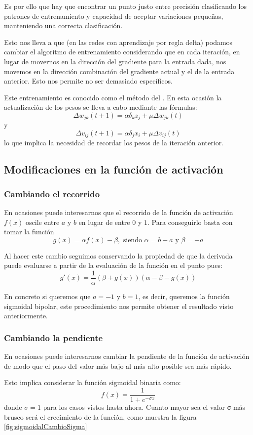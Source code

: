Es por ello que hay que encontrar un punto justo entre precisión clasificando los patrones de entrenamiento y capacidad de aceptar variaciones pequeñas, manteniendo una correcta clasificación.

Esto nos lleva a que (en las redes con aprendizaje por regla delta) podamos cambiar el algoritmo de entrenamiento considerando que en cada iteración, en lugar de movernos en la dirección del gradiente para la entrada dada, nos movemos en la dirección combinación del gradiente actual y el de la entrada anterior. Esto nos permite no ser demasiado específicos.

Este entrenamiento es conocido como el método del . En esta ocasión la actualización de los pesos se lleva a cabo mediante las fórmulas:
\[Δw_{jk}(t+1) = αδ_kz_j + μΔw_{jk}(t)\]
y
\[Δv_{ij}(t+1) = αδ_jx_i + μΔv_{ij}(t)\]
lo que implica la necesidad de recordar los pesos de la iteración anterior.

\subsection{Modificaciones en la función de activación}
\subsubsection{Cambiando el recorrido}
En ocasiones puede interesarnos que el recorrido de la función de activación $f(x)$ oscile entre $a$ y $b$ en lugar de entre $0$ y $1$. Para conseguirlo basta con tomar la función
\[g(x)=αf(x)-β, \text{ siendo } α=b-a \text{ y } β = -a\]

Al hacer este cambio seguimos conservando la propiedad de que la derivada puede evaluarse a partir de la evaluación de la función en el punto pues:
\[g'(x) = \frac{1}{α}(β+g(x))(α-β-g(x))\]

En concreto si queremos que $a=-1$ y $b=1$, es decir, queremos la función sigmoidal bipolar, este procedimiento nos permite obtener el resultado visto anteriormente.

\subsubsection{Cambiando la pendiente}
En ocasiones puede interesarnos cambiar la pendiente de la función de activación de modo que el paso del valor más bajo al más alto posible sea más rápido.

Esto implica considerar la función sigmoidal binaria como:
\[f(x) = \frac{1}{1+e^{-σx}}\]
donde $σ=1$ para los casos vistos hasta ahora. Cuanto mayor sea el valor σ más brusco será el crecimiento de la función, como muestra la figura \ref{fig:sigmoidalCambioSigma}

